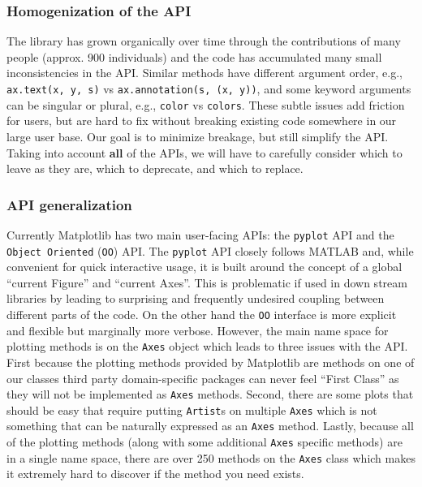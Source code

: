 \documentclass[11pt]{article}  %
\begin{document}
\subsubsection{Homogenization of the API}

The library has grown organically over time through the contributions
of many people (approx. 900 individuals) and the code has accumulated
many small inconsistencies in the API.  Similar methods have different
argument order, e.g., \texttt{ax.text(x, y, s)} vs
\texttt{ax.annotation(s, (x, y))}, and some keyword arguments can be
singular or plural, e.g., \texttt{color} vs \texttt{colors}.  These
subtle issues add friction for users, but are hard to fix without
breaking existing code somewhere in our large user base.  Our goal is
to minimize breakage, but still simplify the API.  Taking into account
\textbf{all} of the APIs, we will have to carefully consider which to
leave as they are, which to deprecate, and which to replace.

\subsubsection{API generalization}

Currently Matplotlib has two main user-facing APIs: the
\texttt{pyplot} API and the \texttt{Object Oriented} (\texttt{OO})
API.
The \texttt{pyplot} API closely follows MATLAB and, while
convenient for quick interactive usage, it is built around the concept
of a global ``current Figure'' and ``current Axes''.
This is
problematic if used in down stream libraries by leading to surprising
and frequently undesired coupling between different parts of the code.
On the other hand the \texttt{OO} interface is more explicit and
flexible but marginally more verbose.
  However, the main name space
for plotting methods is on the \texttt{Axes} object which leads to
three issues with the API.
  First because the plotting methods
provided by Matplotlib are methods on one of our classes third party
domain-specific packages can never feel ``First Class'' as they will
not be implemented as \texttt{Axes} methods.
  Second, there are some
plots that should be easy that require putting \texttt{Artist}s on
multiple \texttt{Axes} which is not something that can be naturally
expressed as an \texttt{Axes} method.
Lastly, because all of the
plotting methods (along with some additional \texttt{Axes} specific
methods) are in a single name space, there are over 250 methods on the
\texttt{Axes} class which makes it extremely hard to discover if the
method you need exists.
\end{document}
